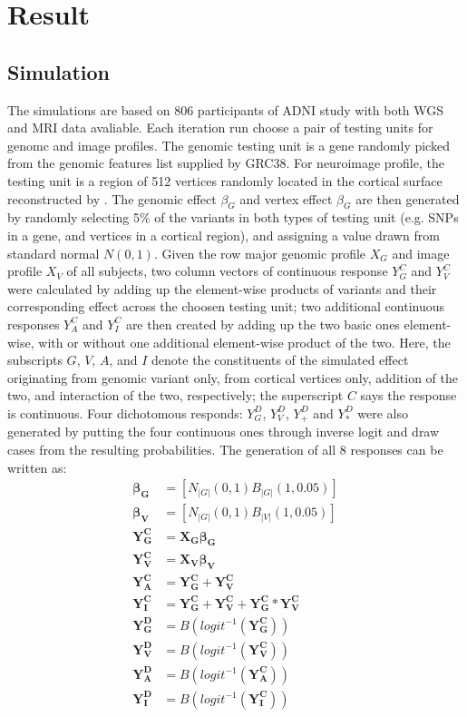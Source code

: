 \section{Result}
\subsection{Simulation}
The simulations are based on 806 participants of ADNI study with both WGS and MRI data avaliable. Each iteration run choose a pair of testing units for genomc and image profiles. The genomic testing unit is a gene randomly picked from the genomic features list supplied by GRC38. For neuroimage profile, the testing unit is a region of 512 vertices randomly located in the cortical surface reconstructed by \FS. The genomic effect $\beta_G$ and vertex effect $\beta_G$ are then generated by randomly selecting 5\% of the variants in both types of testing unit (e.g. SNPs in a gene, and vertices in a cortical region), and assigning a value drawn from standard normal $N(0,1)$. Given the row major genomic profile $X_G$ and image profile $X_V$ of all subjects, two column vectors of continuous response $Y_G^C$ and $Y_V^C$ were calculated by adding up the element-wise products of variants and their corresponding effect across the choosen testing unit; two additional continuous responses $Y_A^C$ and $Y_I^C$ are then created by adding up the two basic ones element-wise, with or without one additional element-wise product of the two. Here, the subscripts $G$, $V$, $A$, and $I$ denote the constituents of the simulated effect originating from genomic variant only, from cortical vertices only, addition of the two, and interaction of the two, respectively; the superscript $C$ says the response is continuous. Four dichotomous responds: $Y_G^D$, $Y_V^D$, $Y_+^D$ and $Y_*^D$ were also generated by putting the four continuous ones through inverse logit and draw cases from the resulting probabilities. The generation of all 8 responses can be written as:
\begin{equation*} \label{eq:SIM}
\begin{split}
  \boldsymbol{\beta_G} &= [N_{|G|}(0,1) B_{|G|}(1, 0.05)] \\
  \boldsymbol{\beta_V} &= [N_{|G|}(0,1) B_{|V|}(1, 0.05)] \\
  \boldsymbol{Y_G^C}     &= \boldsymbol{X_G \beta_G} \\
  \boldsymbol{Y_V^C}     &= \boldsymbol{X_V \beta_V} \\
  \boldsymbol{Y_A^C}     &= \boldsymbol{Y_G^C} + \boldsymbol{Y_V^C} \\
  \boldsymbol{Y_I^C}     &= \boldsymbol{Y_G^C} + \boldsymbol{Y_V^C} + \boldsymbol{Y_G^C * Y_V^C} \\
  \boldsymbol{Y_G^D}     &= B(logit^{-1}(\boldsymbol{Y_G^C})) \\
  \boldsymbol{Y_V^D}     &= B(logit^{-1}(\boldsymbol{Y_V^C})) \\
  \boldsymbol{Y_A^D}     &= B(logit^{-1}(\boldsymbol{Y_A^C})) \\
  \boldsymbol{Y_I^D}     &= B(logit^{-1}(\boldsymbol{Y_I^C}))
\end{split}
\end{equation*}
